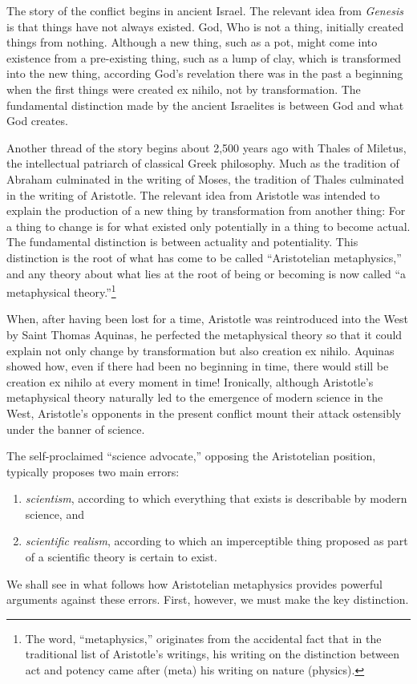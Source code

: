 \documentclass{article}
\begin{document}
The story of the conflict begins in ancient Israel.  The relevant idea from
{\it Genesis} is that things have not always existed.  God, Who is not a thing,
initially created things from nothing.  Although a new thing, such as a pot,
might come into existence from a pre-existing thing, such as a lump of clay,
which is transformed into the new thing, according God's revelation there was
in the past a beginning when the first things were created ex nihilo, not by
transformation.  The fundamental distinction made by the ancient Israelites is
between God and what God creates.

Another thread of the story begins about 2,500 years ago with Thales of
Miletus, the intellectual patriarch of classical Greek philosophy.  Much as the
tradition of Abraham culminated in the writing of Moses, the tradition of
Thales culminated in the writing of Aristotle.  The relevant idea from
Aristotle was intended to explain the production of a new thing by
transformation from another thing: For a thing to change is for what existed
only potentially in a thing to become actual.  The fundamental distinction is
between actuality and potentiality.  This distinction is the root of what has
come to be called ``Aristotelian metaphysics,'' and any theory about what lies
at the root of being or becoming is now called ``a metaphysical
theory.''\footnote{%
   The word, ``metaphysics,'' originates from the accidental fact that in the
   traditional list of Aristotle's writings, his writing on the distinction
   between act and potency came after (meta) his writing on nature (physics).%
}

When, after having been lost for a time, Aristotle was reintroduced into the
West by Saint Thomas Aquinas, he perfected the metaphysical theory so that it
could explain not only change by transformation but also creation ex nihilo.
Aquinas showed how, even if there had been no beginning in time, there would
still be creation ex nihilo at every moment in time!  Ironically, although
Aristotle's metaphysical theory naturally led to the emergence of modern
science in the West, Aristotle's opponents in the present conflict mount their
attack ostensibly under the banner of science.

The self-proclaimed ``science advocate,'' opposing the Aristotelian position,
typically proposes two main errors:
\begin{enumerate}
   \item \emph{scientism}, according to which everything that exists is
      describable by modern science, and
   \item \emph{scientific realism}, according to which an imperceptible thing
      proposed as part of a scientific theory is certain to exist.
\end{enumerate}
We shall see in what follows how Aristotelian metaphysics provides powerful
arguments against these errors.  First, however, we must make the key
distinction.
\end{document}
